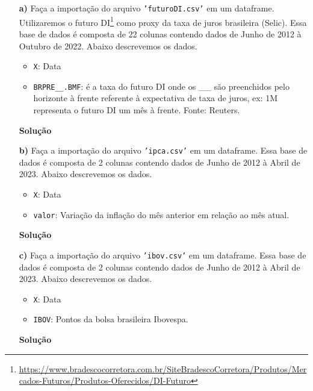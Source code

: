 \documentclass[12pt, a4paper]{article}
\begin{document}
\begin{itemize}
	\item[\textbf{a)}] Faça a importação do arquivo \texttt{'futuroDI.csv'} em um dataframe. Utilizaremos o futuro DI\footnote{\url{https://www.bradescocorretora.com.br/SiteBradescoCorretora/Produtos/Mercados-Futuros/Produtos-Oferecidos/DI-Futuro}} como proxy da taxa de juros brasileira (Selic). Essa base de dados é composta de 22 colunas contendo dados de Junho de 2012 à Outubro de 2022. Abaixo descrevemos os dados.
	
	\begin{itemize}
		\item \texttt{X}: Data
		\item \texttt{BRPRE\_\_.BMF}: é a taxa do futuro DI onde os \_\_ são preenchidos pelo horizonte à frente referente à expectativa de taxa de juros, ex: 1M representa o futuro DI um mês à frente. Fonte: Reuters.
	\end{itemize}
	
	
	
	\textbf{Solução}
	
 	
	
	
	
	\item[\textbf{b)}] Faça a importação do arquivo \texttt{'ipca.csv'} em um dataframe. Essa base de dados é composta de 2 colunas contendo dados de Junho de 2012 à Abril de 2023. Abaixo descrevemos os dados.
	
	\begin{itemize}
		\item \texttt{X}: Data
		\item \texttt{valor}: Variação da inflação do mês anterior em relação ao mês atual.
	\end{itemize}
	
	
	\textbf{Solução}

		
	
	
	
	\item[\textbf{c)}] Faça a importação do arquivo \texttt{'ibov.csv'} em um dataframe. Essa base de dados é composta de 2 colunas contendo dados de Junho de 2012 à Abril de 2023. Abaixo descrevemos os dados.
	
	\begin{itemize}
		\item \texttt{X}: Data
		\item \texttt{IBOV}: Pontos da bolsa brasileira Ibovespa.
	\end{itemize}
	
	
	
	\textbf{Solução}

	
	
	
	
\end{itemize}
\end{document}
